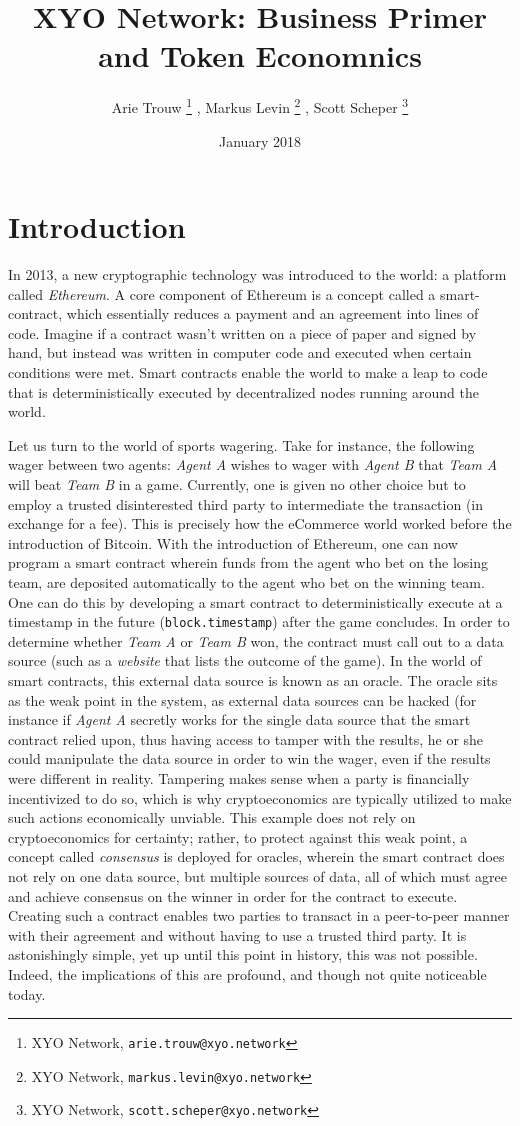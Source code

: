 \documentclass{article}
\title {XYO Network: Business Primer and Token Economnics}
\author{
	Arie Trouw
		\thanks{XYO Network, \texttt{arie.trouw@xyo.network}}
	, Markus Levin
		\thanks{XYO Network, \texttt{markus.levin@xyo.network}}
	, Scott Scheper
		\thanks{XYO Network, \texttt{scott.scheper@xyo.network}}
}
\date{January 2018}
\begin{document}
\pagecolor{lightgreen}

\maketitle

\section{Introduction}
In 2013, a new cryptographic technology was introduced to the world: a platform called \textit{Ethereum}. A core component of Ethereum is a concept called a \gls{smart-contract}, which essentially reduces a payment and an agreement into lines of code. Imagine if a contract wasn't written on a piece of paper and signed by hand, but instead was written in computer code and executed when certain conditions were met. Smart contracts enable the world to make a leap to code that is deterministically executed by decentralized nodes running around the world.

Let us turn to the world of sports wagering. Take for instance, the following wager between two agents: \textit{Agent A} wishes to wager with \textit{Agent B} that \textit{Team A} will beat \textit{Team B} in a game. Currently, one is given no other choice but to employ a trusted disinterested third party to intermediate the transaction (in exchange for a fee). This is precisely how the eCommerce world worked before the introduction of Bitcoin. With the introduction of Ethereum, one can now program a smart contract wherein funds from the agent who bet on the losing team, are deposited automatically to the agent who bet on the winning team. One can do this by developing a smart contract to deterministically execute at a timestamp in the future (\texttt{block.timestamp}) after the game concludes. In order to determine whether \textit{Team A} or \textit{Team B} won, the contract must call out to a data source (such as a \textit{website} that lists the outcome of the game). In the world of smart contracts, this external data source is known as an \gls{oracle}. The oracle sits as the weak point in the system, as external data sources can be hacked (for instance if \textit{Agent A} secretly works for the single data source that the smart contract relied upon, thus having access to tamper with the results, he or she could manipulate the data source in order to win the wager, even if the results were different in reality. Tampering makes sense when a party is financially incentivized to do so, which is why cryptoeconomics are typically utilized to make such actions economically unviable. This example does not rely on cryptoeconomics for certainty; rather, to protect against this weak point, a concept called \textit{consensus} is deployed for oracles, wherein the smart contract does not rely on one data source, but multiple sources of data, all of which must agree and achieve consensus on the winner in order for the contract to execute. Creating such a contract enables two parties to transact in a peer-to-peer manner with their agreement and without having to use a trusted third party. It is astonishingly simple, yet up until this point in history, this was not possible. Indeed, the implications of this are profound, and though not quite noticeable today.
\end{document}
